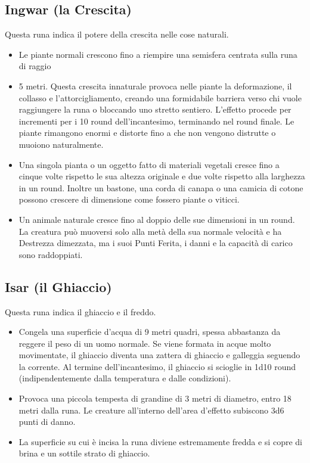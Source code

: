 \documentclass[10pt,a4paper]{article}
\begin{document}
 
\subsection*{Ingwar (la Crescita)}
 
Questa runa indica il potere della crescita nelle cose naturali.
 \begin{itemize}
\item       Le piante normali crescono fino a riempire una semisfera centrata sulla runa di raggio \item5 metri. Questa crescita innaturale provoca nelle piante la deformazione, il collasso e l'attorcigliamento, creando una formidabile barriera verso chi vuole raggiungere la runa o bloccando uno stretto sentiero. L'effetto procede per incrementi per i 10 round dell'incantesimo, terminando nel round finale. Le piante rimangono enormi e distorte fino a che non vengono distrutte o muoiono naturalmente.
 
\item       Una singola pianta o un oggetto fatto di materiali vegetali cresce fino a cinque volte rispetto le sua altezza originale e due volte rispetto alla larghezza in un round. Inoltre un bastone, una corda di canapa o una camicia di cotone possono crescere di dimensione come fossero piante o viticci.
 
\item        Un animale naturale cresce fino al doppio delle sue dimensioni in un round. La creatura pu\`{o} muoversi solo alla met\`{a} della sua normale velocit\`{a} e ha Destrezza dimezzata, ma i suoi Punti Ferita, i danni e la capacit\`{a} di carico sono raddoppiati.
 \end{itemize}
 
 
\subsection*{Isar (il Ghiaccio)}
 
Questa runa indica il ghiaccio e il freddo.
 \begin{itemize}
\item       Congela una superficie d'acqua di 9 metri quadri, spessa abbastanza da reggere il peso di un uomo normale. Se viene formata in acque molto movimentate, il ghiaccio diventa una zattera di ghiaccio e galleggia seguendo la corrente. Al termine dell'incantesimo, il ghiaccio si scioglie in 1d10 round (indipendentemente dalla temperatura e dalle condizioni).
 
\item       Provoca una piccola tempesta di grandine di 3 metri di diametro, entro 18 metri dalla runa. Le creature all'interno dell'area d'effetto subiscono 3d6 punti di danno.

\item 		La superficie su cui \`{e} incisa la runa diviene estremamente fredda e si copre di brina e un sottile strato di ghiaccio.
\end{itemize} 
 
\end{document}
